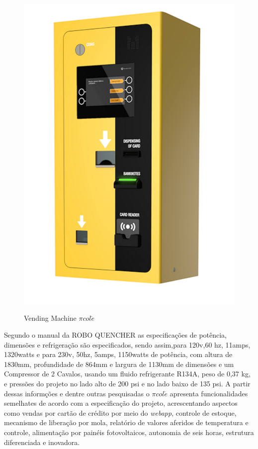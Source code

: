 \begin{figure}[H]
	\centering
    \includegraphics[scale=0.8]{figuras/vending_machine}
    \label{fig:vending_machine}
    \caption{Vending Machine $\pi col\acute{e}$}
\end{figure}

Segundo o manual da ROBO QUENCHER as especificações de potência, dimensões e refrigeração são especificados, sendo assim,para 120v,60 hz, 11amps, 1320watts e para  230v, 50hz, 5amps, 1150watts de potência, com altura de 1830mm, profundidade de 864mm e largura de 1130mm de dimensões e um Compressor de 2 Cavalos, usando um fluido refrigerante R134A, peso de 0,37 kg, e pressões do projeto no lado alto de 200 psi e no lado baixo de 135 psi. A partir dessas informções e dentre outras pesquisadas o $\pi col\acute{e}$ apresenta funcionalidades semelhates de acordo com a especificação do projeto, acrescentando aspectos como vendas por cartão de crédito por meio do  \textit{webapp}, controle de estoque, mecanismo de liberação por mola, relatório de valores aferidos de temperatura e controle, alimentação por painéis fotovoltaicos, autonomia de seis horas, estrutura diferenciada e inovadora.
 \cite{ROBOQUENCHER}



